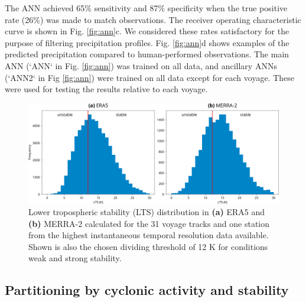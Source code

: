 \documentclass[12pt,a4paper]{article}
\begin{document}
The ANN achieved 65\% sensitivity and 87\% specificity when the true positive
rate (26\%) was made to match observations. The receiver operating
characteristic curve is shown in Fig. \ref{fig:ann}c. We considered these rates
satisfactory for the purpose of filtering precipitation profiles. Fig.
\ref{fig:ann}d shows examples of the predicted precipitation compared to
human-performed observations. The main ANN (`ANN` in Fig. \ref{fig:ann}) was
trained on all data, and ancillary ANNs (`ANN2` in Fig \ref{fig:ann}) were
trained on all data except for each voyage. These were used for testing the
results relative to each voyage.

\begin{figure}[b!]
\centering
\includegraphics[width=\textwidth]{img/lts_dist.pdf}
\caption{
Lower tropospheric stability (LTS) distribution in \textbf{(a)} ERA5 and
\textbf{(b)} MERRA-2 calculated for the 31 voyage tracks and one station from
the highest instantaneous temporal resolution data available. Shown is also the
chosen dividing threshold of 12 K for conditions weak and strong stability.
}
\label{fig:lts}
\end{figure}

\subsection{Partitioning by cyclonic activity and stability}
\label{sec:cyclone-stability}
\end{document}
